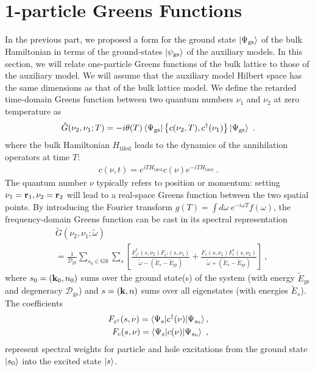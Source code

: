 \documentclass[reprint,hidelinks]{revtex4-2}
\begin{document}
\section{1-particle Greens Functions}
In the previous part, we proposed a form for the ground state \(\ket{\Psi_\text{gs}}\) of the bulk Hamiltonian in terms of the ground-states \(\ket{\psi_\text{gs}}\) of the auxiliary models.
In this section, we will relate one-particle Greens functions of the bulk lattice to those of the auxiliary model. We will assume that the auxiliary model Hilbert space has the same dimensions as that of the bulk lattice model.
We define the retarded time-domain Greens function between two quantum numbers \(\nu_1\) and \(\nu_2 \) at zero temperature as
\begin{equation}\begin{aligned}
	\tilde G(\nu_2, \nu_1; T) = -i\theta(T) \braket{\Psi_\text{gs} | \left\{ c(\nu_2, T), c^\dagger(\nu_1) \right\} | \Psi_\text{gs}}~.
\end{aligned}\end{equation}
where the bulk Hamiltonian \(H_\text{tiled}\) leads to the dynamics of the annihilation operators at time \(T\): 
\begin{equation}\begin{aligned}
	c(\nu,t) = e^{iT H_\text{tiled} }c(\nu)e^{-i T H_\text{tiled}}~.
\end{aligned}\end{equation}
The quantum number \(\nu\) typically refers to position or momentum: setting \(\nu_1={\bf r}_1, \nu_2={\bf r}_2\) will lead to a real-space Greens function between the two spatial points. By introducing the Fourier transform \(g(T) = \int d\omega~ e^{-i\omega T}f(\omega)\), the frequency-domain Greens function can be cast in its spectral representation
\begin{equation}\begin{aligned}\label{spectralRepresentation}
	&\tilde G(\nu_2, \nu_1; \tilde\omega) \\
	&= \frac{1}{\mathcal{D}_\text{gs}}\sum_{s_0 \in \text{GS}}\sum_s \left[\frac{F_{c^\dagger}^*(s, \nu_2)F_{c^\dagger}(s, \nu_1)}{\tilde\omega - \left( \tilde E_s - \tilde E_\text{gs} \right) } + \frac{F_{c}(s, \nu_1)F_{c}^*(s, \nu_2)}{\tilde\omega + \left( \tilde E_s - \tilde E_\text{gs} \right) }\right] ~,
\end{aligned}\end{equation}
where \(s_0=\left({\bf k}_0, n_0\right)\) sums over the ground state(s) of the system (with energy \(\tilde E_\text{gs}\) and degeneracy \(\mathcal{D}_\text{gs}\)) and \(s=\left({\bf k}, n\right)\) sums over all eigenstates (with energies \(\tilde E_s\)). The coefficients 
\begin{equation}\begin{aligned}
	F_{c^\dagger}(s, \nu) = \braket{\Psi_{s}|c^\dagger(\nu)|\Psi_{s_0}},\\
	F_{c}(s, \nu) = \braket{\Psi_{s}|c(\nu)|\Psi_{s_0}}~,
\end{aligned}\end{equation}
represent spectral weights for particle and hole excitations from the ground state \(\ket{s_0}\) into the excited state \(\ket{s}\). 
\end{document}
